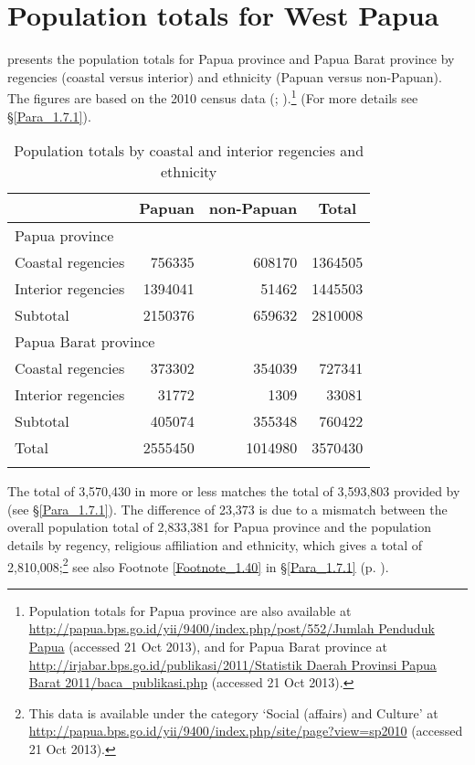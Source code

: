 \chapter{Population totals for West Papua}
\label{Para_E}
 presents the population totals for Papua province and Papua Barat province by regencies (coastal versus interior) and ethnicity (Papuan versus non-Papuan). The figures are based on the 2010 census data (\citealt[11–14]{BidangNeracaWilayahdanAnalisisStatistik.2011b}; \citeyear*[92]{BidangNeracaWilayahdanAnalisisStatistik.2012b}).\footnote{Population totals for Papua province are also available at \url{http://papua.bps.go.id/yii/9400/index.php/post/552/Jumlah Penduduk Papua} (accessed 21 Oct 2013), and for Papua Barat province at \url{http://irjabar.bps.go.id/publikasi/2011/Statistik Daerah Provinsi Papua Barat 2011/baca_publikasi.php} (accessed 21 Oct 2013).} (For more details see §\ref{Para_1.7.1}).

\begin{table}
\begin{tabular}{lrrr}
\lsptoprule
 \multicolumn{1}{c}{Regency}  & \multicolumn{1}{c}{Papuan} & \multicolumn{1}{c}{non-Papuan} & \multicolumn{1}{c}{Total}\\
 \midrule
\multicolumn{4}{l}{Papua province}\\\midrule
 Coastal regencies &  756335 &  608170 &  1364505\\
Interior regencies & 1394041 &  51462 &  1445503\\
 Subtotal &  2150376 &  659632 &  2810008\\\midrule
\multicolumn{4}{l}{Papua Barat province}\\\midrule
 Coastal regencies &  373302 &  354039 &  727341\\
 Interior regencies &  31772 &  1309 &  33081\\
 Subtotal &  405074 &  355348 &  760422\\\midrule
Total &  2555450 &  1014980 &  3570430\\
\lspbottomrule
\end{tabular}
\caption{\label{Table_E.1}Population totals by coastal and interior regencies and ethnicity}
\end{table}
%
The total of 3,570,430 in  more or less matches the total of 3,593,803 provided by \citet[92]{BidangNeracaWilayahdanAnalisisStatistik.2012b} (see §\ref{Para_1.7.1}). The difference of 23,373 is due to a mismatch between the overall population total of 2,833,381 for Papua province \citep[92]{BidangNeracaWilayahdanAnalisisStatistik.2012b} and the population details by regency, religious affiliation and ethnicity, which gives a total of 2,810,008;\footnote{This data is available under the category  ‘Social (affairs) and Culture’ at \url{http://papua.bps.go.id/yii/9400/index.php/site/page?view=sp2010} (accessed 21 Oct 2013).} see also Footnote \ref{Footnote_1.40} in §\ref{Para_1.7.1} (p. \pageref{Footnote_1.40}).

